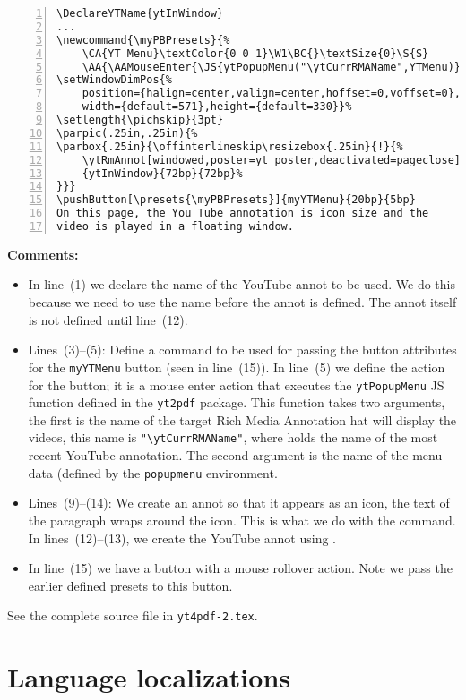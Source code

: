 \documentclass{article}
\newcommand{\YouTube}{\textsf{YouTube}}
\begin{document}
\begin{Verbatim}[numbers=left,xleftmargin=\leftmargini,fontsize=\fontsize{9}{11}\selectfont]
\DeclareYTName{ytInWindow}
...
\newcommand{\myPBPresets}{%
    \CA{YT Menu}\textColor{0 0 1}\W1\BC{}\textSize{0}\S{S}
    \AA{\AAMouseEnter{\JS{ytPopupMenu("\ytCurrRMAName",YTMenu)}}}}
\setWindowDimPos{%
    position={halign=center,valign=center,hoffset=0,voffset=0},
    width={default=571},height={default=330}}%
\setlength{\pichskip}{3pt}
\parpic(.25in,.25in){%
\parbox{.25in}{\offinterlineskip\resizebox{.25in}{!}{%
    \ytRmAnnot[windowed,poster=yt_poster,deactivated=pageclose]%
    {ytInWindow}{72bp}{72bp}%
}}}
\pushButton[\presets{\myPBPresets}]{myYTMenu}{20bp}{5bp}
On this page, the You Tube annotation is icon size and the
video is played in a floating window.
\end{Verbatim}
\textbf{Comments:}
\begin{itemize}
    \item In line~(1) we declare the name of the {\YouTube} annot to be
    used. We do this because we need to use the name before the annot is
    defined. The annot itself is not defined until line~(12).
    \item Lines~(3)--(5): Define a command to be used for passing the
    button attributes for the \texttt{myYTMenu} button (seen in
    line~(15)). In line~(5) we define the action for the button; it is a
    mouse enter action that executes the \texttt{ytPopupMenu} JS function
    defined in the \texttt{yt2pdf} package. This function takes two
    arguments, the first is the name of the target Rich Media Annotation
    hat will display the videos, this name is \verb!"\ytCurrRMAName"!,
    where  holds the name of the most recent {\YouTube}
    annotation. The second argument is the name of the menu data (defined
    by the \texttt{popupmenu} environment.
    \item Lines~(9)--(14): We create an annot so that it appears as an
    icon, the text of the paragraph wraps around the icon. This is what we
    do with the  command. In lines~(12)--(13), we create the
    {\YouTube} annot using .
    \item In line~(15) we have a button with a mouse rollover action. Note
    we pass the earlier defined presets to this button.
\end{itemize}
See the complete source file in \texttt{yt4pdf-2.tex}.


\section{Language localizations}
\end{document}
